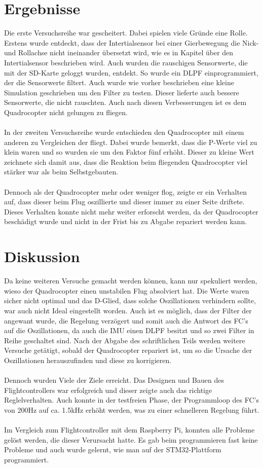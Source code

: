 \documentclass[12pt,a4paper, ngerman]{article}
\begin{document}
\section{Ergebnisse}
Die erste Versuchsreihe war gescheitert. Dabei spielen viele Gründe eine Rolle. Erstens wurde entdeckt, dass der Intertialsensor bei einer Gierbewegung die Nick-und Rollachse nicht ineinander übersetzt wird, wie es in Kapitel über den Intertialsensor beschrieben wird. Auch wurden die rauschigen Sensorwerte, die mit der SD-Karte geloggt wurden, entdekt. So wurde ein DLPF einprogrammiert, der die Sensorwerte filtert. Auch wurde wie vorher beschrieben eine kleine Simulation geschrieben um den Filter zu testen. Dieser lieferte auch bessere Sensorwerte, die nicht rauschten. Auch nach diesen Verbesserungen ist es dem Quadrocopter nicht gelungen zu fliegen. \\ \\In der zweiten Versuchsreihe wurde entschieden den Quadrocopter mit einem anderen zu Vergleichen der fliegt. Dabei wurde bemerkt, dass die P-Werte viel zu klein waren und so wurden sie um den Faktor fünf erhöht. Dieser zu kleine Wert zeichnete sich damit aus, dass die Reaktion beim fliegenden Quadrocopter viel stärker war als beim Selbstgebauten. \\ \\ Dennoch als der Quadrocopter mehr oder weniger flog, zeigte er ein Verhalten auf, dass dieser beim Flug oszillierte und dieser immer zu einer Seite driftete. Dieses Verhalten konnte nicht mehr weiter erforscht werden, da der Quadrocopter beschädigt wurde und nicht in der Frist bis zu Abgabe repariert werden kann.
\newpage
\section{Diskussion}
Da keine weiteren Versuche gemacht werden können, kann nur spekuliert werden, wieso der Quadrocopter einen unstabilen Flug absolviert hat. Die Werte waren sicher nicht optimal und das D-Glied, dass solche Oszillationen verhindern sollte, war auch nicht Ideal eingestellt worden. Auch ist es möglich, dass der Filter der angewant wurde, die Regelung verzögert und somit auch die Antwort des FC's auf die Oszillationen, da auch die IMU einen DLPF besitzt und so zwei Filter in Reihe geschaltet sind. Nach der Abgabe des schriftlichen Teils werden weitere Versuche getätigt, sobald der Quadrocopter repariert ist, um so die Ursache der Oszillationen herauszufinden und diese zu korrigieren. \\ \\ Dennoch wurden Viele der Ziele erreicht. Das Designen und Bauen des Flightcontrollers war erfolgreich und dieser zeigte auch das richtige Reglelverhalten. Auch konnte in der testfreien Phase, der Programmloop des FC's von 200Hz auf ca. 1.5kHz erhöht werden, was zu einer schnelleren Regelung führt.  \\ \\
Im Vergleich zum Flightcontroller mit dem Raspberry Pi, konnten alle Probleme gelöst werden, die dieser Verursacht hatte. Es gab beim programmieren fast keine Probleme und auch wurde gelernt, wie man auf der STM32-Plattform programmiert. 
\end{document}
